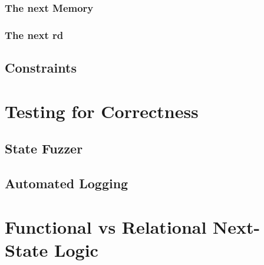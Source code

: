 \subsubsection{The next Memory}
\subsubsection{The next rd}
\subsection{Constraints}
\section{Testing for Correctness}\label{sec:corectness}
\subsection{State Fuzzer}
\subsection{Automated Logging}

\section{Functional vs Relational Next-State Logic}\label{sec:funcVSrel}